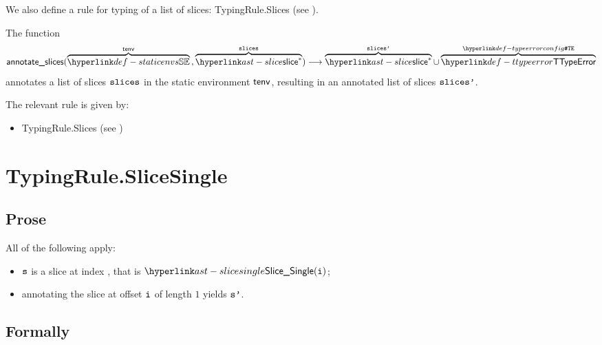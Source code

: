We also define a rule for typing of a list of slices:
TypingRule.Slices (see ).

\hypertarget{def-annotateslices}{}
The function
\[
  \annotateslices(\overname{\staticenvs}{\tenv} \aslsep \overname{\slice^*}{\slices})
  \aslto
  \overname{\slice^*}{\slicesp} \cup \overname{\TTypeError}{\TypeErrorConfig}
\]
annotates a list of slices $\slices$ in the static environment $\tenv$,
resulting in an annotated list of slices $\slicesp$.
\ProseOtherwiseTypeError

The relevant rule is given by:
\begin{itemize}
  \item TypingRule.Slices (see )
\end{itemize}

\section{TypingRule.SliceSingle \label{sec:TypingRule.SliceSingle}}

\subsection{Prose}
All of the following apply:
\begin{itemize}
  \item $\vs$ is a slice at index \vi, that is $\SliceSingle(\vi)$;
  \item annotating the slice at offset $\vi$ of length $1$ yields $\vsp$\ProseOrTypeError.
\end{itemize}



\subsection{Formally}
\begin{mathpar}
\end{mathpar}


